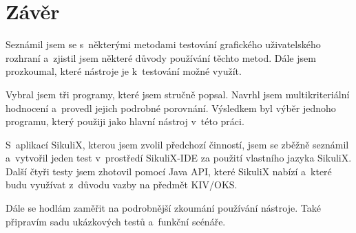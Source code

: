 \documentclass{bakalarka}
\begin{document}
\chapter{Závěr}
Seznámil jsem se s~některými metodami testování grafického uživatelského rozhraní a~zjistil jsem některé důvody používání těchto metod. Dále jsem prozkoumal, které nástroje je k~testování možné využít.

Vybral jsem tři programy, které jsem stručně popsal. Navrhl jsem multikriteriální hodnocení a~provedl jejich podrobné porovnání. Výsledkem byl výběr jednoho programu, který použiji jako hlavní nástroj v~této práci.

S~aplikací SikuliX, kterou jsem zvolil předchozí činností, jsem se zběžně seznámil a~vytvořil jeden test v~prostředí SikuliX-IDE za použití vlastního jazyka SikuliX. Další čtyři testy jsem zhotovil pomocí Java API, které SikuliX nabízí a~které budu využívat z~důvodu vazby na předmět KIV/OKS.

Dále se hodlám zaměřit na podrobnější zkoumání používání nástroje. Také připravím sadu ukázkových testů a~funkční scénáře.
		
\appendix


\end{document}
